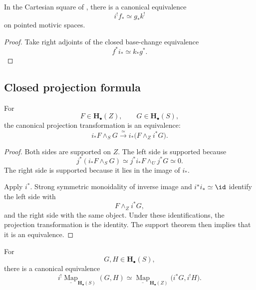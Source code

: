 \begin{corollary}
\label{cor:exceptional-closed-base-change}
In the Cartesian square of
,
there is a canonical equivalence
\[
    i^!f_*
    \simeq
    g_*k^!
\]
on pointed motivic spaces.
\end{corollary}

\begin{proof}
Take right adjoints of the closed base-change equivalence
\[
    f^*i_*
    \simeq
    k_*g^*.
\]
\end{proof}

\subsection{Closed projection formula}

\begin{theorem}
\label{thm:unstable-closed-projection-formula}
For
\[
    F
    \in
    \mathbf H_\bullet(Z),
    \qquad
    G
    \in
    \mathbf H_\bullet(S),
\]
the canonical projection transformation is an equivalence:
\[
    i_*F
    \wedge_S
    G
    \xrightarrow{\simeq}
    i_*
    \bigl(
        F
        \wedge_Z
        i^*G
    \bigr).
\]
\end{theorem}

\begin{proof}
Both sides are supported on \(Z\).  The left side is supported because
\[
    j^*(i_*F\wedge_SG)
    \simeq
    j^*i_*F\wedge_Uj^*G
    \simeq
    0.
\]
The right side is supported because it lies in the image of \(i_*\).

Apply \(i^*\).  Strong symmetric monoidality of inverse image and
\(i^*i_*\simeq\id\) identify the left side with
\[
    F\wedge_Zi^*G,
\]
and the right side with the same object.  Under these identifications,
the projection transformation is the identity.  The support theorem
then implies that it is an equivalence.
\end{proof}

\begin{corollary}
\label{cor:closed-internal-hom-exchange}
For
\[
    G,H
    \in
    \mathbf H_\bullet(S),
\]
there is a canonical equivalence
\[
    i^!
    \underline{\operatorname{Map}}_{\mathbf H_\bullet(S)}(G,H)
    \simeq
    \underline{\operatorname{Map}}_{\mathbf H_\bullet(Z)}
    \bigl(
        i^*G,
        i^!H
    \bigr).
\]
\end{corollary}


